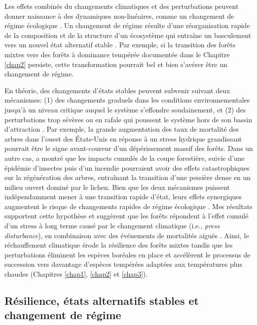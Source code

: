 Les effets combinés du changements climatiques et des perturbations
peuvent donner naissance à des dynamiques non-linéaires, comme un
changement de régime écologique \citep[Fig.
\ref{fig4.2};][]{scheffer_catastrophic_2001, harris_biological_2018}. Un
changement de régime résulte d'une réorganisation rapide de la
composition et de la structure d'un écosystème qui entraîne un
basculement vers un nouvel état alternatif stable
\citep{scheffer_catastrophic_2001}. Par exemple, si la transition des
forêts mixtes vers des forêts à dominance tempérée documentée dans le
Chapitre \ref{chap2} persiste, cette transformation pourrait bel et bien
s'avérer être un changement de régime.

En théorie, des changements d'états stables peuvent subvenir suivant
deux mécanismes: (1) des changements graduels dans les conditions
environnementales jusqu'à un niveau critique auquel le système
s'effondre soudainement, et (2) des perturbations trop sévères ou en
rafale qui poussent le système hors de son bassin d'attraction
\citep{scheffer_catastrophic_2001}. Par exemple, la grande augmentation
des taux de mortalité des arbres dans l'ouest des États-Unis en réponse
à un stress hydrique grandissant \citep{van_mantgem_apparent_2007}
pourrait être le signe avant-coureur d'un dépérissement massif des
forêts. Dans un autre cas, \citet{payette_shift_2003} a montré que les
impacts cumulés de la coupe forestière, suivie d'une épidémie d'insectes
puis d'un incendie pourraient avoir des effets catastrophiques sur la
régénération des arbres, entraînant la transition d'une pessière dense
en un milieu ouvert dominé par le lichen. Bien que les deux mécanismes
puissent indépendamment mener à une transition rapide d'état, leurs
effets synergiques augmentent le risque de changements rapides de régime
écologique \citep{scheffer_catastrophic_2001, harris_biological_2018}.
Mes résultats supportent cette hypothèse et suggèrent que les forêts
répondent à l'effet cumulé d'un stress à long terme causé par le
changement climatique (i.e., \emph{press disturbance}), en combinaison
avec des événements de mortalités aiguës \citep[i.e., \emph{pulse
disturbance};][]{harris_biological_2018}. Ainsi, le réchauffement
climatique érode la résilience des forêts mixtes tandis que les
perturbations éliminent les espèces boréales en place et accélèrent le
processus de succession vers davantage d'espèces tempérées adaptées aux
températures plus chaudes (Chapitres \ref{chap1}, \ref{chap2} et
\ref{chap3}).

\hypertarget{ruxe9silience-uxe9tats-alternatifs-stables-et-changement-de-ruxe9gime}{%
\subsection{Résilience, états alternatifs stables et changement de
régime}\label{ruxe9silience-uxe9tats-alternatifs-stables-et-changement-de-ruxe9gime}}

